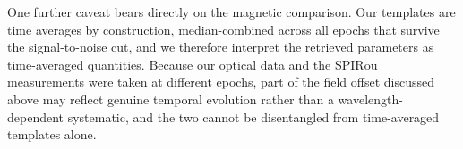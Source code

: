 One further caveat bears directly on the magnetic comparison. Our templates are time averages by construction, median-combined across all epochs that survive the signal-to-noise cut, and we therefore interpret the retrieved parameters as time-averaged quantities. Because our optical data and the SPIRou measurements were taken at different epochs, part of the field offset discussed above may reflect genuine temporal evolution rather than a wavelength-dependent systematic, and the two cannot be disentangled from time-averaged templates alone.




